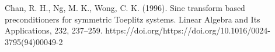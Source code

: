 \documentclass{article}
\begin{document}
\begin{thebibliography}{9}
Chan, R. H., Ng, M. K., Wong, C. K. (1996). Sine transform based
preconditioners for symmetric Toeplitz systems. Linear Algebra and Its
Applications, 232,
237–259. https://doi.org/https://doi.org/10.1016/0024-3795(94)00049-2
\end{thebibliography}
\end{document}
